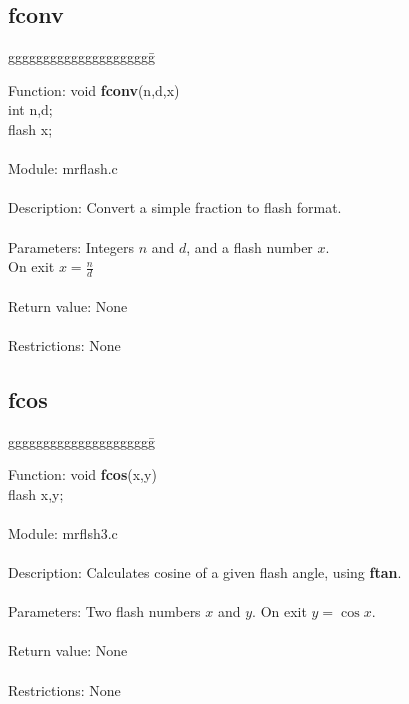 \subsection{fconv}

\begin{tabbing}
ggggggggggggggggggggg\= \kill

      Function:      \>void {\bf fconv}(n,d,x) \\
                     \>int n,d; \\
                     \>flash x; \\
      \ \\
      Module:        \>mrflash.c \\
      \ \\
      Description:   \>Convert a simple fraction to flash format. \\
      \ \\
      Parameters:    \>Integers $n$ and $d$, and a flash number $x$. \\
                     \>On exit $x=\frac{n}{d}$ \\
      \ \\
      Return value:  \>None \\
      \ \\
      Restrictions:  \>None \\
      
\end{tabbing}

\subsection{fcos}

\begin{tabbing}
ggggggggggggggggggggg\= \kill


      Function:      \>void {\bf fcos}(x,y) \\
                     \>flash x,y; \\
      \ \\
      Module:        \>mrflsh3.c \\
      \ \\
      Description:   \>Calculates cosine of a given flash angle, using {\bf ftan}. \\
      \ \\
      Parameters:    \>Two flash numbers $x$ and $y$. On exit $y=\cos x$. \\
      \ \\
      Return value:  \>None \\
      \ \\
      Restrictions:  \>None \\

\end{tabbing}
\pagebreak
